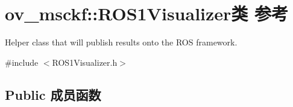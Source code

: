 \hypertarget{classov__msckf_1_1ROS1Visualizer}{}\section{ov\+\_\+msckf\+:\+:R\+O\+S1\+Visualizer类 参考}
\label{classov__msckf_1_1ROS1Visualizer}


Helper class that will publish results onto the R\+OS framework.  




{\ttfamily \#include $<$R\+O\+S1\+Visualizer.\+h$>$}

\subsection*{Public 成员函数}
